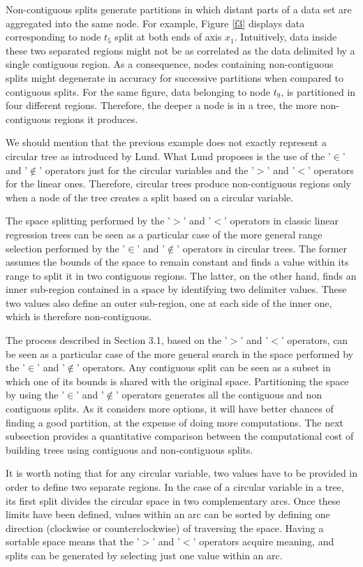 \documentclass[times,twocolumn,final,authoryear]{elsarticle}
\begin{document}
Non-contiguous splits generate partitions in which distant parts of a data set are aggregated into the same node. For example, Figure \ref{f3} displays data corresponding to node $t_5$ split at both ends of axis $x_1$. Intuitively, data inside these two separated regions might not be as correlated as the data delimited by a single contiguous region. As a consequence, nodes containing non-contiguous splits might degenerate in accuracy for successive partitions when compared to contiguous splits. For the same figure, data belonging to node $t_9$, is partitioned in four different regions. Therefore, the deeper a node is in a tree, the more non-contiguous regions it produces.

We should mention that the previous example does not exactly represent a circular tree as introduced by Lund. What Lund proposes is the use of the '$\in$' and '$\notin$' operators just for the circular variables and the '$>$' and '$<$' operators for the linear ones. Therefore, circular trees produce non-contiguous regions only when a node of the tree creates a split based on a circular variable.

The space splitting performed by the '$>$' and '$<$' operators in classic linear regression trees can be seen as a particular case of the more general range selection performed by the '$\in$' and '$\notin$' operators in circular trees. The former assumes the bounds of the space to remain constant and finds a value within its range to split it in two contiguous regions. The latter, on the other hand, finds an inner sub-region contained in a space by identifying two delimiter values. These two values also define an outer sub-region, one at each side of the inner one, which is therefore non-contiguous.

The process described in Section 3.1, based on the '$>$' and '$<$' operators, can be seen as a particular case of the more general search in the space performed by the '$\in$' and '$\notin$' operators. Any contiguous split can be seen as a subset in which one of its bounds is shared with the original space. Partitioning the space by using the '$\in$' and '$\notin$' operators generates all the contiguous and non contiguous splits. As it considers more options, it will have better chances of finding a good partition, at the expense of doing more computations. The next subsection provides a quantitative comparison between the computational cost of building trees using contiguous and non-contiguous splits.

It is worth noting that for any circular variable, two values have to be provided in order to define two separate regions. In the case of a circular variable in a tree, its first split divides the circular space in two complementary arcs. Once these limits have been defined, values within an arc can be sorted by defining one direction (clockwise or counterclockwise) of traversing the space. Having a sortable space means that the '$>$' and '$<$' operators acquire meaning, and splits can be generated by selecting just one value within an arc.
\end{document}
